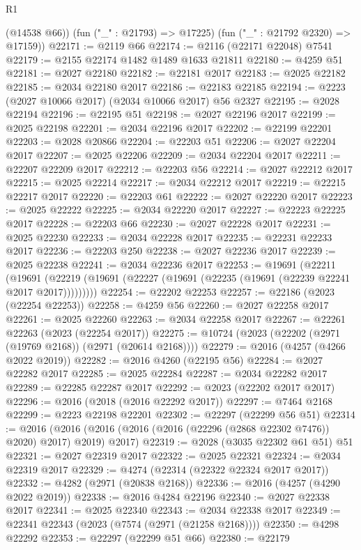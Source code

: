 \begin{lexlean}{R1}
\begin{coremodule}
        (@14538 @66))
      (fun ("_" : @21793) => @17225)
      (fun ("_" : @21792 @2320) => @17159))
@22171 := @2119 @66
@22174 := @2116 (@22171 @22048) @7541
@22179 := @2155 @22174 @1482 @1489 @1633 @21811
@22180 := @4259 @51
@22181 := @2027 @22180
@22182 := @22181 @2017
@22183 := @2025 @22182
@22185 := @2034 @22180 @2017
@22186 := @22183 @22185
@22194 := @2223 (@2027 @10066 @2017) (@2034 @10066 @2017) @56 @2327
@22195 := @2028 @22194
@22196 := @22195 @51
@22198 := @2027 @22196 @2017
@22199 := @2025 @22198
@22201 := @2034 @22196 @2017
@22202 := @22199 @22201
@22203 := @2028 @20866
@22204 := @22203 @51
@22206 := @2027 @22204 @2017
@22207 := @2025 @22206
@22209 := @2034 @22204 @2017
@22211 := @22207 @22209 @2017
@22212 := @22203 @56
@22214 := @2027 @22212 @2017
@22215 := @2025 @22214
@22217 := @2034 @22212 @2017
@22219 := @22215 @22217 @2017
@22220 := @22203 @61
@22222 := @2027 @22220 @2017
@22223 := @2025 @22222
@22225 := @2034 @22220 @2017
@22227 := @22223 @22225 @2017
@22228 := @22203 @66
@22230 := @2027 @22228 @2017
@22231 := @2025 @22230
@22233 := @2034 @22228 @2017
@22235 := @22231 @22233 @2017
@22236 := @22203 @250
@22238 := @2027 @22236 @2017
@22239 := @2025 @22238
@22241 := @2034 @22236 @2017
@22253 := @19691
    (@22211
      (@19691 (@22219 (@19691 (@22227 (@19691 (@22235 (@19691 (@22239 @22241 @2017 @2017)))))))))
@22254 := @22202 @22253
@22257 := @22186 (@2023 (@22254 @22253))
@22258 := @4259 @56
@22260 := @2027 @22258 @2017
@22261 := @2025 @22260
@22263 := @2034 @22258 @2017
@22267 := @22261 @22263 (@2023 (@22254 @2017))
@22275 := @10724 (@2023 (@22202 (@2971 (@19769 @2168)) (@2971 (@20614 @2168))))
@22279 := @2016 (@4257 (@4266 @2022 @2019))
@22282 := @2016 @4260 (@22195 @56)
@22284 := @2027 @22282 @2017
@22285 := @2025 @22284
@22287 := @2034 @22282 @2017
@22289 := @22285 @22287 @2017
@22292 := @2023 (@22202 @2017 @2017)
@22296 := @2016 (@2018 (@2016 @22292 @2017))
@22297 := @7464 @2168
@22299 := @2223 @22198 @22201
@22302 := @22297 (@22299 @56 @51)
@22314 := @2016
    (@2016 (@2016 (@2016 (@2016 (@22296 (@2868 @22302 @7476)) @2020) @2017) @2019) @2017)
@22319 := @2028 (@3035 @22302 @61 @51) @51
@22321 := @2027 @22319 @2017
@22322 := @2025 @22321
@22324 := @2034 @22319 @2017
@22329 := @4274 (@22314 (@22322 @22324 @2017 @2017))
@22332 := @4282 (@2971 (@20838 @2168))
@22336 := @2016 (@4257 (@4290 @2022 @2019))
@22338 := @2016 @4284 @22196
@22340 := @2027 @22338 @2017
@22341 := @2025 @22340
@22343 := @2034 @22338 @2017
@22349 := @22341 @22343 (@2023 (@7574 (@2971 (@21258 @2168))))
@22350 := @4298 @22292
@22353 := @22297 (@22299 @51 @66)
@22380 := @22179

\end{coremodule}
\end{lexlean}
